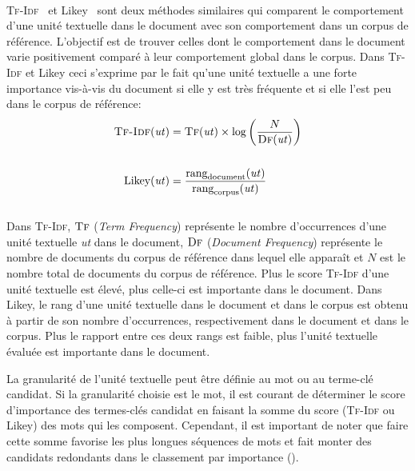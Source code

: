         ~\\\textsc{Tf-Idf}~\cite{jones1972tfidf} et Likey~\cite{paukkeri2010likey}
        sont deux méthodes similaires qui comparent le comportement d'une unité
        textuelle dans le document avec son comportement dans un corpus de
        référence. L'objectif est de trouver celles dont le
        comportement dans le document varie positivement comparé à leur
        comportement global dans le corpus. Dans \textsc{Tf-Idf} et Likey ceci
        s'exprime par le fait qu'une unité textuelle a une forte importance
        vis-à-vis du document si elle y est très fréquente et si elle l'est
        peu dans le corpus de référence:
        \begin{align}
          \text{\textsc{Tf-Idf}}(\text{\textit{ut}}) &= \textsc{Tf}(\text{\textit{ut}}) \times \log\left(\frac{N}{\textsc{Df}(\text{\textit{ut}})}\right) \label{math:tfidf}\\
          \notag\\
          \text{Likey}(\text{\textit{ut}}) &= \frac{\text{rang}_{\text{document}}(\text{\textit{ut}})}{\text{rang}_{\text{corpus}}(\text{\textit{ut}})} \label{math:likey}
        \end{align}\\
        Dans \textsc{Tf-Idf}, $\textsc{Tf}$ (\textit{Term Frequency}) représente
        le nombre d'occurrences d'une unité textuelle \textit{ut} dans le
        document, $\textsc{Df}$ (\textit{Document Frequency}) représente le
        nombre de documents du corpus de référence dans lequel elle apparaît et
        $N$ est le nombre total de documents du corpus de référence. Plus le
        score \textsc{Tf-Idf} d'une unité textuelle est élevé, plus celle-ci est
        importante dans le document. Dans Likey, le rang d'une unité textuelle
        dans le document et dans le corpus est obtenu à partir de son nombre
        d'occurrences, respectivement dans le document et dans le corpus. Plus
        le rapport entre ces deux rangs est faible, plus l'unité textuelle
        évaluée est importante dans le document.

        La granularité de l'unité textuelle peut être définie au mot ou au
        terme-clé candidat. Si la granularité choisie est le mot, il est courant
        de déterminer le score d'importance des termes-clés candidat en faisant
        la somme du score (\textsc{Tf-Idf} ou Likey) des mots qui les composent.
        Cependant, il est important de noter que faire cette somme favorise les
        plus longues séquences de mots et fait monter des candidats redondants
        dans le classement par importance ().

